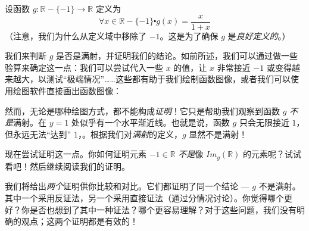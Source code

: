 \begin{example}
    设函数 $g : \mathbb{R} - \{-1\} \to \mathbb{R}$ 定义为
    \[\forall x \in \mathbb{R} - \{-1\} \centerdot g(x) = \frac{x}{1+x}\]
    （注意，我们为什么从定义域中移除了 $-1$。这是为了确保 $g$ 是\emph{良好定义的}。）

    我们来判断 $g$ 是否是满射，并证明我们的结论。如前所述，我们可以通过做一些验算来确定这一点：我们可以尝试代入一些 $x$ 的值，让 $x$ 非常接近 $-1$ 或变得越来越大，以测试``极端情况''……这些都有助于我们绘制函数图像，或者我们可以使用绘图软件直接画出函数图像：

    \begin{center}
    \end{center}

    然而，无论是哪种绘图方式，都不能构成\emph{证明}！它只是帮助我们观察到函数 $g$ \emph{不是}满射。在 $y = 1$ 处似乎有一个水平渐近线。也就是说，函数 $g$ 只会无限接近 $1$，但永远无法``达到'' $1$，。根据我们对\emph{满射}的定义，$g$ 显然不是满射！

    现在尝试证明这一点。你如何证明元素 $-1 \in \mathbb{R}$ \emph{不是}像 $Im_g(\mathbb{R})$ 的元素呢？试试看吧！然后继续阅读我们的证明。

    我们将给出\emph{两个}证明供你比较和对比。它们都证明了同一个结论 --- $g$ 不是满射。其中一个采用反证法，另一个采用直接证法（通过分情况讨论）。你觉得哪个更好？你是否也想到了其中一种证法？哪个更容易理解？对于这些问题，我们没有明确的观点；这两个证明都是有效的！


\end{example}
